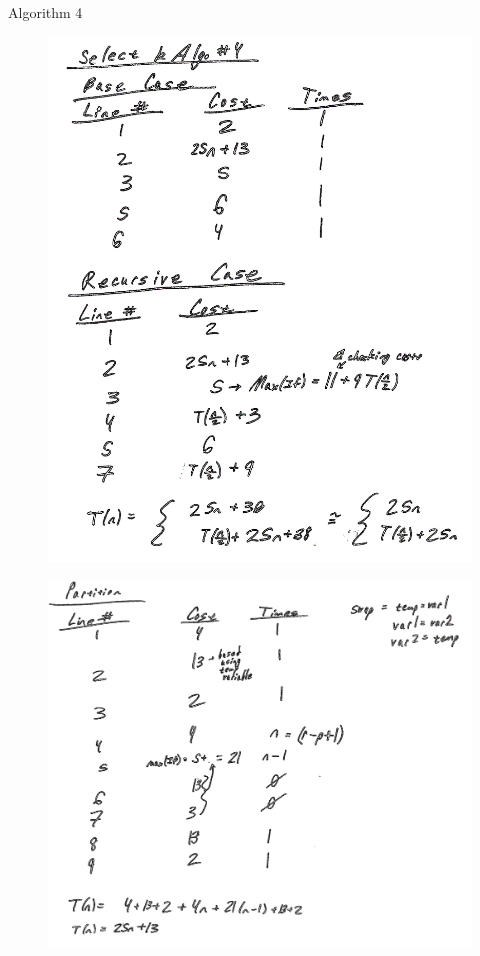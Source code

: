 \documentclass{article}
\begin{document}
\begin{enumerate}
  Algorithm 4
  \begin{figure}[H]
    \centering
    \includegraphics[width = \textwidth]{pics/alg4a}
  \end{figure}
  \begin{figure}[H]
    \centering
    \includegraphics[width = \textwidth]{pics/alg4b}

\end{figure}
\end{enumerate}
\end{document}
